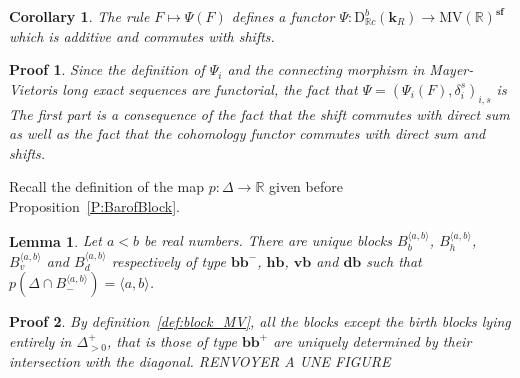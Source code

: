 \documentclass[a4paper, english, 11pt]{article}
\newcommand{\kk}[0]{\textbf{k}}
\newcommand{\0}{\vec{0}}
\newcommand{\R}[0]{\mathbb{R}}
\newcommand{\D}[0]{\text{D}}
\newcommand{\MV}{\text{MV}}
\newcommand{\s}{\textbf{sf}}
\newtheorem*{pf}{Proof} }
\newtheorem{cor}[prop]{Corollary}
\newtheorem{lem}[prop]{Lemma}
\begin{document}
\begin{cor}
The rule $F\mapsto \Psi(F)$ defines a functor $\Psi: \D^b_{\R c}(\kk_R)\to \MV(\R)^\s$ 
which is additive and commutes with shifts.
\end{cor}
\begin{pf} Since the definition of $\Psi_i$ and the connecting morphism in Mayer-Vietoris long exact sequences are functorial, the fact that $\Psi= (\Psi_i(F), \delta^s_i)_{i,s}$ is 
The first part is a consequence of the fact that the shift commutes with direct sum as well as the fact that the cohomology functor commutes with direct sum and shifts. 
\end{pf}
Recall the definition of the map $p: \Delta\to \R$ given before Proposition~\ref{P:BarofBlock}.
\begin{lem}\label{L:Blockassociatedtointerval}
 Let  $a<b$ be real numbers. There are unique  blocks $B_{b}^{\langle a, b\rangle}$, $B_{h}^{\langle a, b\rangle}$, $B_{v}^{\langle a, b\rangle}$ and $B_{d}^{\langle a, b\rangle}$ respectively of type $\textbf{bb}^{-}$, $\textbf{hb}$, $\textbf{vb}$ and $\textbf{db}$ such that $p(\Delta\cap B_{-}^{\langle a, b\rangle}) = \langle a,b \rangle$. 
\end{lem}
\begin{pf}
By definition~\ref{def:block_MV}, all the blocks except the birth blocks lying entirely in $\Delta^+_{>0}$, that is those of type $\textbf{bb}^{+}$  are uniquely determined by their intersection with the diagonal. RENVOYER A UNE FIGURE
\end{pf}
\end{document}
